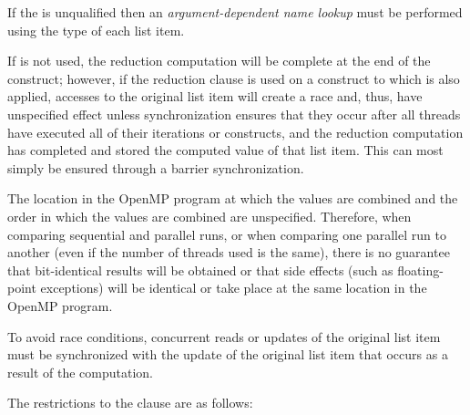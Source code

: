 If the  is unqualified then an \emph{argument-dependent name lookup} must 
be performed using the type of each list item.
\cppspecificend

If  is not used, the reduction computation will be complete at the end of the 
construct; however, if the reduction clause is used on a construct to which  is 
also applied, accesses to the original list item will create a race and, thus, have 
unspecified effect unless synchronization ensures that they occur after all threads have 
executed all of their iterations or  constructs, and the reduction computation 
has completed and stored the computed value of that list item. This can most simply be 
ensured through a barrier synchronization. 

The location in the OpenMP program at which the values are combined and the order in 
which the values are combined are unspecified. Therefore, when comparing sequential 
and parallel runs, or when comparing one parallel run to another (even if the number of 
threads used is the same), there is no guarantee that bit-identical results will be obtained 
or that side effects (such as floating-point exceptions) will be identical or take place at 
the same location in the OpenMP program.

To avoid race conditions, concurrent reads or updates of the original list item must be 
synchronized with the update of the original list item that occurs as a result of the 
 computation.

\restrictions
The restrictions to the  clause are as follows:

